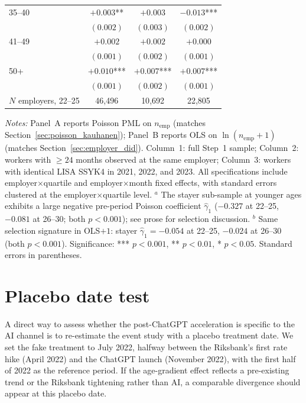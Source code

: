\documentclass[preprint,12pt,authoryear]{elsarticle}
\begin{document}
\begin{table}[htbp]
\begin{tabular}{@{}lccc@{}}
35--40 & $+0.003$**  & $+0.003$    & $-0.013$*** \\
       & $(0.002)$    & $(0.003)$    & $(0.002)$ \\
41--49 & $+0.002$    & $+0.002$    & $+0.000$    \\
       & $(0.001)$    & $(0.002)$    & $(0.001)$ \\
50+    & $+0.010$*** & $+0.007$*** & $+0.007$*** \\
       & $(0.001)$    & $(0.002)$    & $(0.001)$ \\
\midrule
$N$ employers, 22--25 & 46{,}496 & 10{,}692 & 22{,}805 \\
\bottomrule
\end{tabular}
\par\medskip
\noindent\parbox{\linewidth}{\raggedright\scriptsize \emph{Notes:} Panel~A reports Poisson PML on $n_{\text{emp}}$ (matches Section~\ref{sec:poisson_kauhanen}); Panel~B reports OLS on $\ln(n_{\text{emp}}+1)$ (matches Section~\ref{sec:employer_did}). Column~1: full Step~1 sample; Column~2: workers with $\geq 24$ months observed at the same employer; Column~3: workers with identical LISA SSYK4 in 2021, 2022, and 2023. All specifications include employer$\times$quartile and employer$\times$month fixed effects, with standard errors clustered at the employer$\times$quartile level. $^{a}$ The stayer sub-sample at younger ages exhibits a large negative pre-period Poisson coefficient $\hat\gamma_1$ ($-0.327$ at 22--25, $-0.081$ at 26--30; both $p<0.001$); see prose for selection discussion. $^{b}$ Same selection signature in OLS$+1$: stayer $\hat\gamma_1 = -0.054$ at 22--25, $-0.024$ at 26--30 (both $p<0.001$). Significance: *** $p<0.001$, ** $p<0.01$, * $p<0.05$. Standard errors in parentheses.}

\end{table}


\section{Placebo date test}
\label{sec:placebo}

A direct way to assess whether the post-ChatGPT acceleration is specific to the AI channel is to re-estimate the event study with a placebo treatment date. We set the fake treatment to July 2022, halfway between the Riksbank's first rate hike (April 2022) and the ChatGPT launch (November 2022), with the first half of 2022 as the reference period. If the age-gradient effect reflects a pre-existing trend or the Riksbank tightening rather than AI, a comparable divergence should appear at this placebo date.
\end{document}
